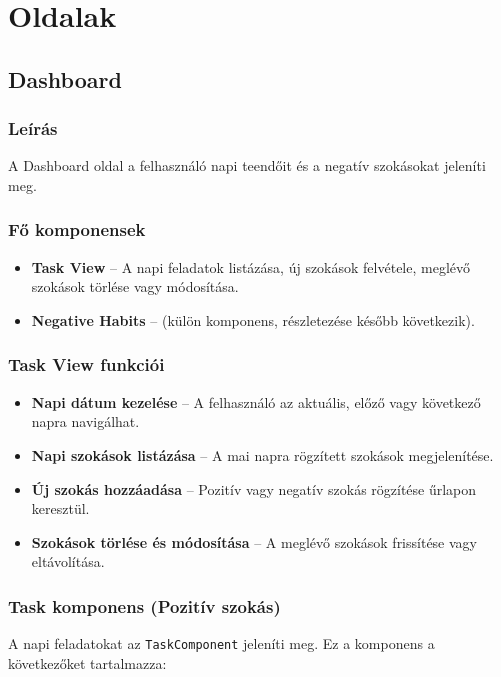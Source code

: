 \documentclass[12pt]{report}
\begin{document}
\section{Oldalak}
\subsection{Dashboard}

\subsubsection{Leírás}
A Dashboard oldal a felhasználó napi teendőit és a negatív szokásokat jeleníti meg.

\subsubsection{Fő komponensek}

\begin{itemize}
  \item \textbf{Task View} -- A napi feladatok listázása, új szokások felvétele, meglévő szokások törlése vagy módosítása.
  \item \textbf{Negative Habits} -- (külön komponens, részletezése később következik).
\end{itemize}

\subsubsection{Task View funkciói}

\begin{itemize}
  \item \textbf{Napi dátum kezelése} -- A felhasználó az aktuális, előző vagy következő napra navigálhat.
  \item \textbf{Napi szokások listázása} -- A mai napra rögzített szokások megjelenítése.
  \item \textbf{Új szokás hozzáadása} -- Pozitív vagy negatív szokás rögzítése űrlapon keresztül.
  \item \textbf{Szokások törlése és módosítása} -- A meglévő szokások frissítése vagy eltávolítása.
\end{itemize}

\subsubsection{Task komponens (Pozitív szokás)}

A napi feladatokat az \texttt{TaskComponent} jeleníti meg. Ez a komponens a következőket tartalmazza:
\end{document}
